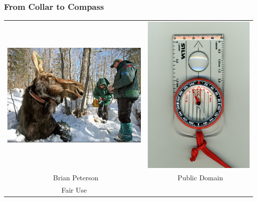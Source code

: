 \documentclass[compress, aspectratio=169]{beamer}
\begin{document}
\begin{frame}
	\frametitle{From Collar to Compass}
	
	\begin{tabular}{cc}
	\includegraphics[scale=0.332]{moosecollar.png} & \includegraphics[scale=0.4]{compass.jpeg} \\
	\tiny \ccCopy\ Brian Peterson & \tiny \ccPublicDomain\ Public Domain \\
	\tiny Fair Use & \\
	\end{tabular}
\end{frame}
\end{document}
